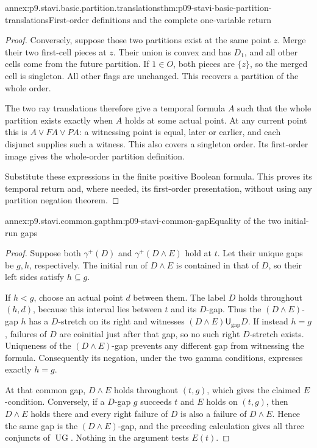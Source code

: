 \begin{annexitem}{annex:p9.stavi.basic.partition.translations}{thm:p09-stavi-basic-partition-translations}{First-order definitions and the complete one-variable return}
\begin{proof}
Conversely, suppose those
two partitions exist at
the same point \(z\).
Merge their two first-cell
pieces at \(z\). Their
union is convex and has
\(D_1\), and all other
cells come from the
future partition.
If \(1\in O\), both
pieces are \(\{z\}\),
so the merged cell
is singleton. All
other flags are
unchanged. This
recovers a partition
of the whole order.

The two ray translations
therefore give a
temporal formula \(A\)
such that the whole
partition exists
exactly when \(A\)
holds at some
actual point.
At any current
point this is
\(A\lor FA\lor PA\):
a witnessing point
is equal, later
or earlier, and
each disjunct
supplies such
a witness.
This also covers
a singleton order.
Its first-order
image gives the
whole-order
partition definition.

Substitute these
expressions in
the finite
positive Boolean
formula. This
proves its
temporal return
and, where needed,
its first-order
presentation, without
using any partition
negation theorem.
\end{proof}
\end{annexitem}

\begin{annexitem}{annex:p9.stavi.common.gap}{thm:p09-stavi-common-gap}{Equality of the two initial-run gaps}
\begin{proof}
Suppose both \(\gamma^+(D)\) and
\(\gamma^+(D\land E)\) hold at \(t\).
Let their unique gaps be \(g,h\),
respectively. The initial run of
\(D\land E\) is contained in that
of \(D\), so their left sides
satisfy \(h\subseteq g\).

If \(h<g\), choose an actual
point \(d\) between them.
The label \(D\) holds throughout
\((h,d)\), because this interval
lies between \(t\) and its
\(D\)-gap. Thus the
\((D\land E)\)-gap \(h\)
has a \(D\)-stretch on its
right and witnesses
\((D\land E)\mathbin{\mathsf U_{\mathrm{gap}}}D\).
If instead \(h=g\), failures
of \(D\) are coinitial just
after that gap, so no such
right \(D\)-stretch exists.
Uniqueness of the
\((D\land E)\)-gap prevents
any different gap from
witnessing the formula.
Consequently its negation,
under the two gamma
conditions, expresses
exactly \(h=g\).

At that common gap,
\(D\land E\) holds
throughout \((t,g)\),
which gives the claimed
\(E\)-condition.
Conversely, if a
\(D\)-gap \(g\)
succeeds \(t\)
and \(E\) holds
on \((t,g)\),
then \(D\land E\)
holds there and
every right failure
of \(D\) is also
a failure of
\(D\land E\).
Hence the same
gap is the
\((D\land E)\)-gap,
and the preceding
calculation gives
all three conjuncts
of \(\operatorname{UG}\).
Nothing in the
argument tests
\(E(t)\).
\end{proof}
\end{annexitem}

